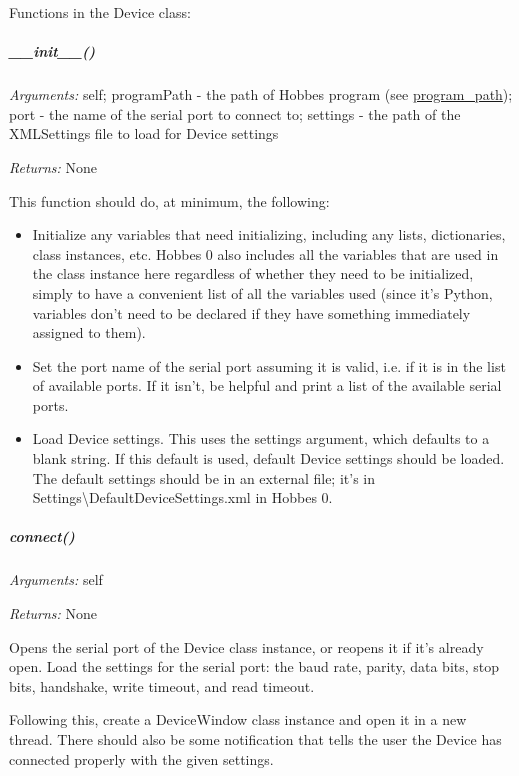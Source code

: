 \documentclass[12pt,letterpaper]{article}
\begin{document}
Functions in the Device class:

\setcounter{subparagraph}{-1}



%
%
\subparagraph{\_\_init\_\_()}
\label{4.3.1.2.0}

\emph{Arguments:} self; programPath - the path of Hobbes program (see \hyperref[4.1.2.1]{program\_path}); port - the name of the serial port to connect to; settings - the path of the XMLSettings file to load for Device settings

\emph{Returns:} None

This function should do, at minimum, the following:

\begin{itemize}

\item Initialize any variables that need initializing, including any lists, dictionaries, class instances, etc. Hobbes 0 also includes all the variables that are used in the class instance here regardless of whether they need to be initialized, simply to have a convenient list of all the variables used (since it's Python, variables don't need to be declared if they have something immediately assigned to them).

\item Set the port name of the serial port assuming it is valid, i.e. if it is in the list of available ports. If it isn't, be helpful and print a list of the available serial ports.

\item Load Device settings. This uses the settings argument, which defaults to a blank string. If this default is used, default Device settings should be loaded. The default settings should be in an external file; it's in Settings\textbackslash DefaultDeviceSettings.xml in Hobbes 0.

\end{itemize}



%
%
\subparagraph{connect()}
\label{4.3.1.2.1}

\emph{Arguments:} self

\emph{Returns:} None

Opens the serial port of the Device class instance, or reopens it if it's already open. Load the settings for the serial port: the baud rate, parity, data bits, stop bits, handshake, write timeout, and read timeout.

Following this, create a DeviceWindow class instance and open it in a new thread. There should also be some notification that tells the user the Device has connected properly with the given settings.
\end{document}
